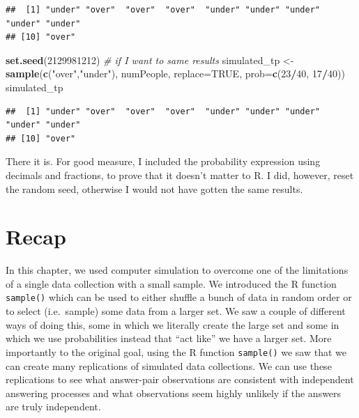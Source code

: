 \documentclass[openany]{book}
\newenvironment{Shaded}{\begin{snugshade}}{\end{snugshade}}
\newcommand{\CommentTok}[1]{\textcolor[rgb]{0.56,0.35,0.01}{\textit{#1}}}
\newcommand{\DataTypeTok}[1]{\textcolor[rgb]{0.13,0.29,0.53}{#1}}
\newcommand{\DecValTok}[1]{\textcolor[rgb]{0.00,0.00,0.81}{#1}}
\newcommand{\KeywordTok}[1]{\textcolor[rgb]{0.13,0.29,0.53}{\textbf{#1}}}
\newcommand{\NormalTok}[1]{#1}
\newcommand{\OperatorTok}[1]{\textcolor[rgb]{0.81,0.36,0.00}{\textbf{#1}}}
\newcommand{\OtherTok}[1]{\textcolor[rgb]{0.56,0.35,0.01}{#1}}
\newcommand{\StringTok}[1]{\textcolor[rgb]{0.31,0.60,0.02}{#1}}
\begin{document}
\begin{verbatim}
##  [1] "under" "over"  "over"  "over"  "under" "under" "under" "under" "under"
## [10] "over"
\end{verbatim}

\begin{Shaded}
\begin{Highlighting}[]
\KeywordTok{set.seed}\NormalTok{(}\DecValTok{2129981212}\NormalTok{) }\CommentTok{# if I want to same results}
\NormalTok{simulated_tp <-}\StringTok{ }\KeywordTok{sample}\NormalTok{(}\KeywordTok{c}\NormalTok{(}\StringTok{"over"}\NormalTok{,}\StringTok{"under"}\NormalTok{), numPeople, }\DataTypeTok{replace=}\OtherTok{TRUE}\NormalTok{, }\DataTypeTok{prob=}\KeywordTok{c}\NormalTok{(}\DecValTok{23}\OperatorTok{/}\DecValTok{40}\NormalTok{, }\DecValTok{17}\OperatorTok{/}\DecValTok{40}\NormalTok{))}
\NormalTok{simulated_tp}
\end{Highlighting}
\end{Shaded}

\begin{verbatim}
##  [1] "under" "over"  "over"  "over"  "under" "under" "under" "under" "under"
## [10] "over"
\end{verbatim}

There it is. For good measure, I included the probability expression using decimals and fractions, to prove that it doesn't matter to R. I did, however, reset the random seed, otherwise I would not have gotten the same results.

\hypertarget{recap}{%
\section*{Recap}\label{recap}}

In this chapter, we used computer simulation to overcome one of the limitations of a single data collection with a small sample. We introduced the R function \texttt{sample()} which can be used to either shuffle a bunch of data in random order or to select (i.e.~sample) some data from a larger set. We saw a couple of different ways of doing this, some in which we literally create the large set and some in which we use probabilities instead that ``act like'' we have a larger set. More importantly to the original goal, using the R function \texttt{sample()} we saw that we can create many replications of simulated data collections. We can use these replications to see what answer-pair observations are consistent with independent answering processes and what observations seem highly unlikely if the answers are truly independent.
\end{document}
